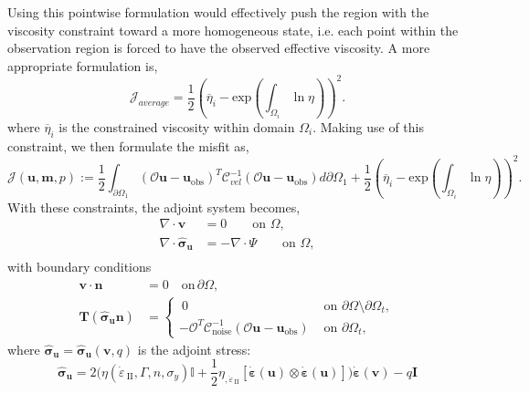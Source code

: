 \documentclass[12pt]{article}
\newcommand{\IIinv}{{\dot\varepsilon}_{\mathrm{\!\!\:II}}}
\newcommand{\mm}{{\ensuremath{\boldsymbol{m}}}}
\newcommand{\uu}{{\ensuremath{\boldsymbol{u}}}}
\newcommand{\vv}{{\ensuremath{\boldsymbol{v}}}}
\newcommand{\ssigma}{{\ensuremath{\boldsymbol{\sigma}}}}
\newcommand{\strain}{{\ensuremath{\dot{\boldsymbol{\varepsilon}}}}}
\begin{document}

Using this pointwise formulation would effectively push the region with the viscosity constraint toward a more homogeneous state, i.e. each point within the observation region is forced to have the observed effective viscosity. A more appropriate formulation is,
\begin{equation}
 \mathcal{J}_{average}=\frac{1}{2}(\overline{\eta}_i - \text{exp}({\int_{\Omega_i} \ln \eta}))^{2}.
\end{equation}
where $\overline{\eta}_i$ is the constrained viscosity within domain $\Omega_i$.
Making use of this constraint, we then formulate the misfit as,
\begin{equation}
  \mathcal{J}(\uu,\mm,p):= \frac{1}{2}\int_{\partial \Omega_1} (\mathcal{O}\uu-\uu_{\text{obs}})^T\mathcal{C}^{-1}_{vel}(\mathcal{O}\uu-\uu_{\text{obs}})d\partial\Omega_1 
   +\frac{1}{2}(\overline{\eta}_i - \text{exp}({\int_{\Omega_i} \ln \eta}))^{2}.
\end{equation}
With these constraints, the adjoint system becomes,
\begin{equation}
  \label{eq:adjoint}
  \begin{split}
    \nabla \cdot \vv &=0 \qquad  \text{on } \Omega, \\
    \nabla \cdot \hat \ssigma_\uu&=-\nabla \cdot \Psi   \qquad \text{on } \Omega, \\
  \end{split}
\end{equation}
with boundary conditions
\begin{align*}
  \vv\cdot \textbf{n}&=0 \quad \text{on} \, \partial \Omega, \\
  \textbf{T}(\hat\ssigma_\uu \textbf{n})
  &=\begin{cases} \:0 & \text{ on }\partial \Omega\setminus
  \partial\Omega_t, \\
  -\mathcal{O}^T\mathcal{C}^{-1}_{\text{noise}}(\mathcal O \uu-\uu_{\text{obs}}) &\text{ on }
  \partial\Omega_t,
  \end{cases}
  \label{eq:adjoint}
\end{align*}
where $\hat\ssigma_\uu = \hat\ssigma_\uu(\vv,q)$ is the adjoint stress: 
\begin{equation}\label{eq:sigma_hat}
\hat\ssigma_\uu  = 2 \Big(\eta(\IIinv,\Gamma, n,
\sigma_y)\mathbb{I}+\frac{1}{2} \eta_{,\IIinv} [\strain(\uu)\otimes
      \strain(\uu)]\Big)\strain(\vv) -q\textbf{I}
\end{equation}
\end{document}
